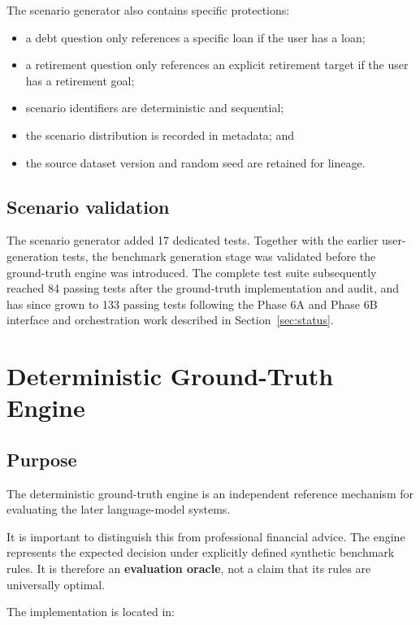 \documentclass[12pt,a4paper]{article}
\begin{document}
The scenario generator also contains specific protections:
\begin{itemize}
    \item a debt question only references a specific loan if the user has a loan;
    \item a retirement question only references an explicit retirement target if the user has a retirement goal;
    \item scenario identifiers are deterministic and sequential;
    \item the scenario distribution is recorded in metadata; and
    \item the source dataset version and random seed are retained for lineage.
\end{itemize}

\subsection{Scenario validation}

The scenario generator added 17 dedicated tests. Together with the earlier user-generation tests, the benchmark generation stage was validated before the ground-truth engine was introduced. The complete test suite subsequently reached 84 passing tests after the ground-truth implementation and audit, and has since grown to 133 passing tests following the Phase 6A and Phase 6B interface and orchestration work described in Section~\ref{sec:status}.

\section{Deterministic Ground-Truth Engine}

\subsection{Purpose}

The deterministic ground-truth engine is an independent reference mechanism for evaluating the later language-model systems.

It is important to distinguish this from professional financial advice. The engine represents the expected decision under explicitly defined synthetic benchmark rules. It is therefore an \textbf{evaluation oracle}, not a claim that its rules are universally optimal.

The implementation is located in:
\end{document}
